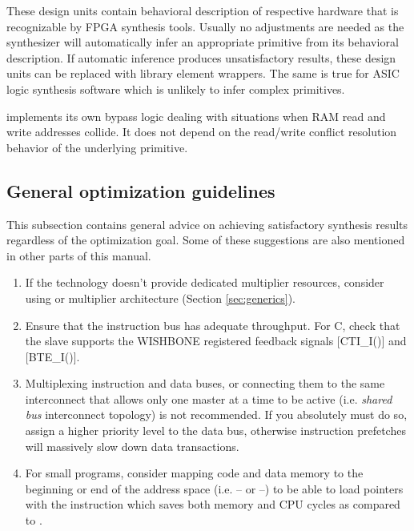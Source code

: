 \documentclass[a4paper,12pt,twoside,extrafontsizes]{memoir}
\begin{document}
These design units contain behavioral description of respective hardware that is recognizable by FPGA synthesis tools. Usually no adjustments are needed as the synthesizer will automatically infer an appropriate primitive from its behavioral description. If automatic inference produces unsatisfactory results, these design units can be replaced with library element wrappers. The same is true for ASIC logic synthesis software which is unlikely to infer complex primitives.

\lxp{} implements its own bypass logic dealing with situations when RAM read and write addresses collide. It does not depend on the read/write conflict resolution behavior of the underlying primitive.

\subsection{General optimization guidelines}

This subsection contains general advice on achieving satisfactory synthesis results regardless of the optimization goal. Some of these suggestions are also mentioned in other parts of this manual.

\begin{enumerate}
	\item If the technology doesn't provide dedicated multiplier resources, consider using  or  multiplier architecture (Section \ref{sec:generics}).
	
	\item Ensure that the instruction bus has adequate throughput. For \lxp{}C, check that the slave supports the WISHBONE registered feedback signals [CTI\_I()] and [BTE\_I()].
	
	\item Multiplexing instruction and data buses, or connecting them to the same interconnect that allows only one master at a time to be active (i.e. \emph{shared bus} interconnect topology) is not recommended. If you absolutely must do so, assign a higher priority level to the data bus, otherwise instruction prefetches will massively slow down data transactions.
	
	\item For small programs, consider mapping code and data memory to the beginning or end of the address space (i.e. -- or --) to be able to load pointers with the  instruction which saves both memory and CPU cycles as compared to .
\end{enumerate}
\end{document}
